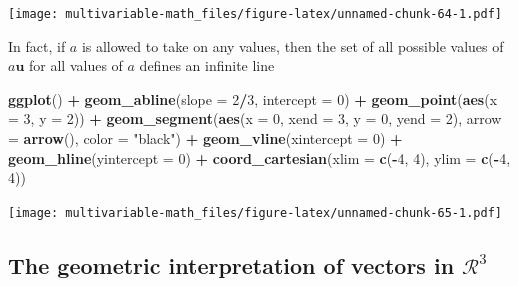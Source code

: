 \documentclass[
]{book}
\newenvironment{Shaded}{\begin{snugshade}}{\end{snugshade}}
\newcommand{\DataTypeTok}[1]{\textcolor[rgb]{0.13,0.29,0.53}{#1}}
\newcommand{\DecValTok}[1]{\textcolor[rgb]{0.00,0.00,0.81}{#1}}
\newcommand{\KeywordTok}[1]{\textcolor[rgb]{0.13,0.29,0.53}{\textbf{#1}}}
\newcommand{\NormalTok}[1]{#1}
\newcommand{\OperatorTok}[1]{\textcolor[rgb]{0.81,0.36,0.00}{\textbf{#1}}}
\newcommand{\StringTok}[1]{\textcolor[rgb]{0.31,0.60,0.02}{#1}}
\theoremstyle{definition}
\theoremstyle{definition}
\theoremstyle{definition}
\theoremstyle{definition}
\theoremstyle{remark}
\begin{document}
\texttt{[image: multivariable-math\_files/figure-latex/unnamed-chunk-64-1.pdf]}

In fact, if \(a\) is allowed to take on any values, then the set of all possible values of \(a \mathbf{u}\) for all values of \(a\) defines an infinite line

\begin{Shaded}
\begin{Highlighting}[]
\KeywordTok{ggplot}\NormalTok{() }\OperatorTok{+}
\StringTok{    }\KeywordTok{geom_abline}\NormalTok{(}\DataTypeTok{slope =} \DecValTok{2}\OperatorTok{/}\DecValTok{3}\NormalTok{, }\DataTypeTok{intercept =} \DecValTok{0}\NormalTok{) }\OperatorTok{+}\StringTok{  }
\StringTok{    }\KeywordTok{geom_point}\NormalTok{(}\KeywordTok{aes}\NormalTok{(}\DataTypeTok{x =} \DecValTok{3}\NormalTok{, }\DataTypeTok{y =} \DecValTok{2}\NormalTok{)) }\OperatorTok{+}
\StringTok{    }\KeywordTok{geom_segment}\NormalTok{(}\KeywordTok{aes}\NormalTok{(}\DataTypeTok{x =} \DecValTok{0}\NormalTok{, }\DataTypeTok{xend =} \DecValTok{3}\NormalTok{, }\DataTypeTok{y =} \DecValTok{0}\NormalTok{, }\DataTypeTok{yend =} \DecValTok{2}\NormalTok{), }\DataTypeTok{arrow =} \KeywordTok{arrow}\NormalTok{(), }\DataTypeTok{color =} \StringTok{"black"}\NormalTok{) }\OperatorTok{+}
\StringTok{    }\KeywordTok{geom_vline}\NormalTok{(}\DataTypeTok{xintercept =} \DecValTok{0}\NormalTok{) }\OperatorTok{+}\StringTok{ }
\StringTok{    }\KeywordTok{geom_hline}\NormalTok{(}\DataTypeTok{yintercept =} \DecValTok{0}\NormalTok{) }\OperatorTok{+}
\StringTok{    }\KeywordTok{coord_cartesian}\NormalTok{(}\DataTypeTok{xlim =} \KeywordTok{c}\NormalTok{(}\OperatorTok{-}\DecValTok{4}\NormalTok{, }\DecValTok{4}\NormalTok{), }\DataTypeTok{ylim =} \KeywordTok{c}\NormalTok{(}\OperatorTok{-}\DecValTok{4}\NormalTok{, }\DecValTok{4}\NormalTok{)) }
\end{Highlighting}
\end{Shaded}

\texttt{[image: multivariable-math\_files/figure-latex/unnamed-chunk-65-1.pdf]}

\hypertarget{the-geometric-interpretation-of-vectors-in-mathcalr3}{%
\subsection{\texorpdfstring{The geometric interpretation of vectors in \(\mathcal{R}^3\)}{The geometric interpretation of vectors in \textbackslash mathcal\{R\}\^{}3}}\label{the-geometric-interpretation-of-vectors-in-mathcalr3}}
\end{document}
